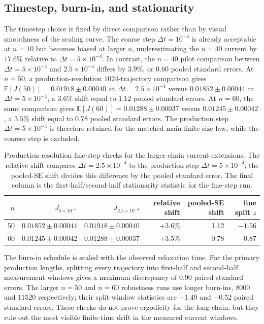 \documentclass[11pt,a4paper]{article}
\theoremstyle{definition}
\newcommand{\E}{\mathbb{E}}
\numberwithin{equation}{section}   %
\begin{document}
\subsection{Timestep, burn-in, and stationarity}
\label{app:timestep-stationarity}

The timestep choice is fixed by direct comparison rather than by visual
smoothness of the scaling curve. The coarse step $\Delta t=10^{-3}$ is already
acceptable at $n=10$ but becomes biased at larger $n$, underestimating the
$n=40$ current by $17.6\%$ relative to $\Delta t=5\times10^{-4}$. In contrast,
the $n=40$ pilot comparison between $\Delta t=5\times10^{-4}$ and
$2.5\times10^{-4}$ differs by $3.9\%$, or $0.60$ pooled standard errors. At
$n=50$, a production-resolution $1024$-trajectory comparison gives
$\E[J(50)]=0.01918\pm0.00040$ at $\Delta t=2.5\times10^{-4}$ versus
$0.01852\pm0.00044$ at $\Delta t=5\times10^{-4}$, a $3.6\%$ shift equal to
$1.12$ pooled standard errors. At $n=60$, the same comparison gives
$\E[J(60)]=0.01288\pm0.00037$ versus $0.01245\pm0.00042$, a $3.5\%$ shift
equal to $0.78$ pooled standard errors. The production step
$\Delta t=5\times10^{-4}$ is therefore retained for the matched main
finite-size law, while the coarser step is excluded.

\begin{table}[ht]
\centering
\small
\begin{tabular}{rrrrrr}
\toprule
$n$ & $J_{5\times10^{-4}}$ & $J_{2.5\times10^{-4}}$
& relative shift & pooled-SE shift & fine split $z$ \\
\midrule
50 & $0.01852\pm0.00044$ & $0.01918\pm0.00040$ & $+3.6\%$ & 1.12 & $-1.56$ \\
60 & $0.01245\pm0.00042$ & $0.01288\pm0.00037$ & $+3.5\%$ & 0.78 & $-0.87$ \\
\bottomrule
\end{tabular}
\caption{Production-resolution fine-step checks for the larger-chain current
extensions. The relative shift compares $\Delta t=2.5\times10^{-4}$ to the
production step $\Delta t=5\times10^{-4}$; the pooled-SE shift divides this
difference by the pooled standard error. The final column is the
first-half/second-half stationarity statistic for the fine-step run.}
\label{tab:production-fine-step}
\end{table}

The burn-in schedule is scaled with the observed relaxation time. For the
primary production lengths, splitting every trajectory into first-half and
second-half measurement windows gives a maximum discrepancy of $0.90$ paired
standard errors. The larger $n=50$ and $n=60$ robustness runs use longer
burn-ins, $8000$ and $11520$ respectively; their split-window statistics are
$-1.49$ and $-0.52$ paired standard errors. These checks do not prove
ergodicity for the long chain, but they rule out the most visible finite-time
drift in the measured current windows.
\end{document}
